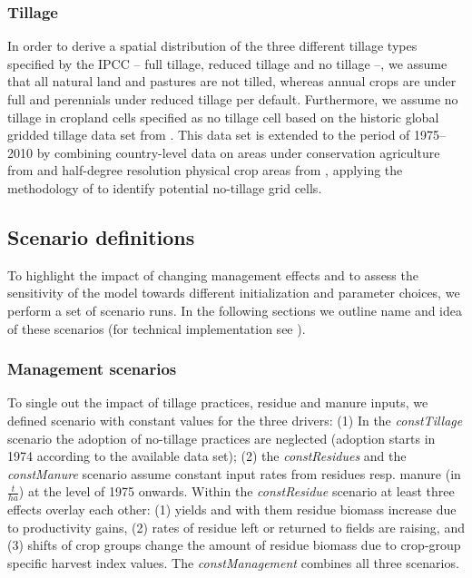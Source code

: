 \documentclass[gc, manuscript]{copernicus}
\begin{document}
\hypertarget{sec:tillage}{%
\subsubsection{Tillage}\label{sec:tillage}}

In order to derive a spatial distribution of the three different tillage types specified by the IPCC -- full tillage, reduced tillage and no tillage --, we assume that all natural land and pastures are not tilled, whereas annual crops are under full and perennials under reduced tillage per default. Furthermore, we assume no tillage in cropland cells specified as no tillage cell based on the historic global gridded tillage data set from \citep{porwollik_generating_2018}. This data set is extended to the period of 1975--2010 by combining country-level data on areas under conservation agriculture from \citep{fao_aquastat_2016} and half-degree resolution physical crop areas from \citep{hurtt_harmonization_2020}, applying the methodology of \citep{porwollik_generating_2018} to identify potential no-tillage grid cells.

\hypertarget{sec:scenarios}{%
\subsection{Scenario definitions}\label{sec:scenarios}}

To highlight the impact of changing management effects and to assess the sensitivity of the model towards different initialization and parameter choices, we perform a set of scenario runs. In the following sections we outline name and idea of these scenarios (for technical implementation see \citep{mrsoil_karstens_2020}).

\hypertarget{sec:scen_management}{%
\subsubsection{Management scenarios}\label{sec:scen_management}}

To single out the impact of tillage practices, residue and manure inputs, we defined scenario with constant values for the three drivers: (1) In the \textit{constTillage} scenario the adoption of no-tillage practices are neglected (adoption starts in 1974 according to the available data set); (2) the \textit{constResidues} and the \textit{constManure} scenario assume constant input rates from residues resp. manure (in \(\tfrac{t}{ha}\)) at the level of 1975 onwards. Within the \textit{constResidue} scenario at least three effects overlay each other: (1) yields and with them residue biomass increase due to productivity gains, (2) rates of residue left or returned to fields are raising, and (3) shifts of crop groups change the amount of residue biomass due to crop-group specific harvest index values. The \textit{constManagement} combines all three scenarios.
\end{document}
